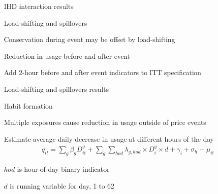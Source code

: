 \documentclass[aspectratio=169]{beamer}
\newenvironment{wideitemize}{\itemize\addtolength{\itemsep}{10pt}}{\enditemize}
\begin{document}
\begin{frame}{IHD interaction results}
    \center
\end{frame}

\begin{frame}{Load-shifting and spillovers}
    \begin{wideitemize}
        \item Conservation during event may be offset by load-shifting
        \item Reduction in usage before and after event
        \item Add 2-hour before and after event indicators to ITT specification
    \end{wideitemize}
\end{frame}

\begin{frame}{Load-shifting and spillovers results}
    \center
\end{frame}

\begin{frame}{Habit formation}
    \begin{wideitemize}
        \item Multiple exposures cause reduction in usage outside of price events
        \item Estimate average daily decrease in usage at different hours of the day
        \begin{align*}
            q _ { i t } = \sum _ { g } \beta _ { g } D _ { i t } ^ { g } + \sum _ { g } \sum _ { h o d } \lambda _ { g , h o d } \times D _ { i } ^ { g } \times d + \gamma _ { i } + \sigma _ { h } + \mu _ { i t }
        \end{align*}
        \item $hod$ is hour-of-day binary indicator
        \item $d$ is running variable for day, 1 to 62
    \end{wideitemize}
\end{frame}
\end{document}
